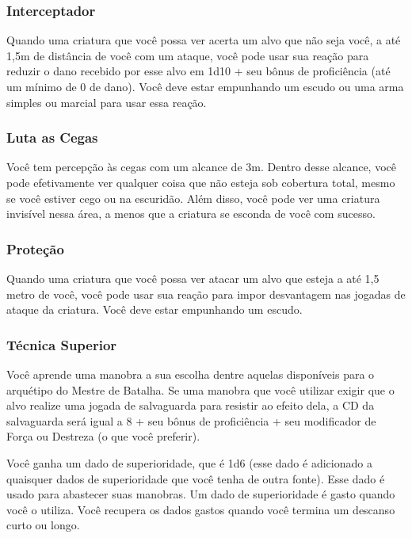 \documentclass{RPG_Adventure}[2021/10/20]
\begin{document}
\subsubsection{Interceptador}%
\label{ssub:interceptador}

Quando uma criatura que você possa ver acerta um alvo que não seja você, a até
1,5m de distância de você com um ataque, você pode usar sua reação para reduzir
o dano recebido por esse alvo em 1d10 + seu bônus de proficiência (até um mínimo
de 0 de dano). Você deve estar empunhando um escudo ou uma arma simples ou
marcial para usar essa reação.

\subsubsection{Luta as Cegas}%
\label{ssub:luta_as_cegas}

Você tem percepção às cegas com um alcance de 3m. Dentro desse alcance, você
pode efetivamente ver qualquer coisa que não esteja sob cobertura total, mesmo
se você estiver cego ou na escuridão. Além disso, você pode ver uma criatura
invisível nessa área, a menos que a criatura se esconda de você com sucesso.

\subsubsection{Proteção}%
\label{ssub:protecao}

Quando uma criatura que você possa ver atacar um alvo que esteja a até 1,5 metro
de você, você pode usar sua reação para impor desvantagem nas jogadas de ataque
da criatura. Você deve estar empunhando um escudo.

\subsubsection{Técnica Superior}%
\label{ssub:tecnica_superior}

Você aprende uma manobra a sua escolha dentre aquelas disponíveis para o
arquétipo do Mestre de Batalha. Se uma manobra que você utilizar exigir que o
alvo realize uma jogada de salvaguarda para resistir ao efeito dela, a CD da
salvaguarda será igual a 8 + seu bônus de proficiência + seu modificador de
Força ou Destreza (o que você preferir).

Você ganha um dado de superioridade, que é 1d6 (esse dado é adicionado a
quaisquer dados de superioridade que você tenha de outra fonte). Esse dado é
usado para abastecer suas manobras. Um dado de superioridade é gasto quando você
o utiliza. Você recupera os dados gastos quando você termina um descanso curto
ou longo.
\end{document}
